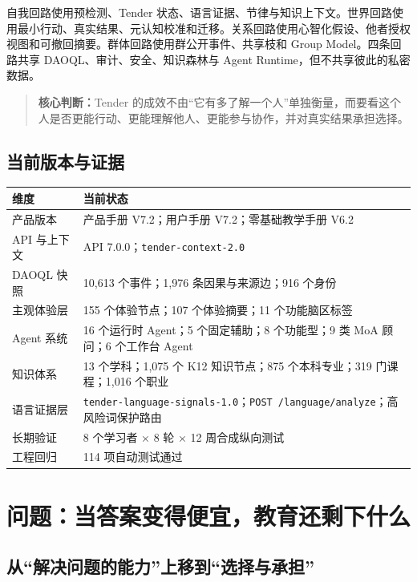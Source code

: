 \documentclass[UTF8,a4paper,11pt]{ctexart}
\newcommand{\keypoint}[1]{\begin{quote}\noindent\textbf{\color{TenderBlue}核心判断：}#1\end{quote}}
\begin{document}
自我回路使用预检测、Tender 状态、语言证据、节律与知识上下文。世界回路使用最小行动、真实结果、元认知校准和迁移。关系回路使用心智化假设、他者授权视图和可撤回摘要。群体回路使用群公开事件、共享枝和 Group Model。四条回路共享 DAOQL、审计、安全、知识森林与 Agent Runtime，但不共享彼此的私密数据。

\keypoint{Tender 的成效不由“它有多了解一个人”单独衡量，而要看这个人是否更能行动、更能理解他人、更能参与协作，并对真实结果承担选择。}

\subsection{当前版本与证据}

\begin{center}
\begin{tabularx}{\textwidth}{@{}p{4.6cm}X@{}}
\toprule
\textbf{维度} & \textbf{当前状态} \\
\midrule
产品版本 & 产品手册 V7.2；用户手册 V7.2；零基础教学手册 V6.2 \\
API 与上下文 & API 7.0.0；\texttt{tender-context-2.0} \\
DAOQL 快照 & 10,613 个事件；1,976 条因果与来源边；916 个身份 \\
主观体验层 & 155 个体验节点；107 个体验摘要；11 个功能脑区标签 \\
Agent 系统 & 16 个运行时 Agent；5 个固定辅助；8 个功能型；9 类 MoA 顾问；6 个工作台 Agent \\
知识体系 & 13 个学科；1,075 个 K12 知识节点；875 个本科专业；319 门课程；1,016 个职业 \\
语言证据层 & \texttt{tender-language-signals-1.0}；\texttt{POST /language/analyze}；高风险词保护路由 \\
长期验证 & 8 个学习者 × 8 轮 × 12 周合成纵向测试 \\
工程回归 & 114 项自动测试通过 \\
\bottomrule
\end{tabularx}
\end{center}

\newpage
\section{问题：当答案变得便宜，教育还剩下什么}

\subsection{从“解决问题的能力”上移到“选择与承担”}
\end{document}
